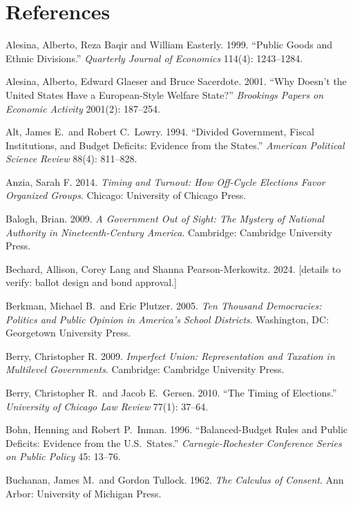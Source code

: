 \section*{References}
\begingroup
\setlength{\parindent}{-0.28in}\setlength{\leftskip}{0.28in}\small

Alesina, Alberto, Reza Baqir and William Easterly. 1999. ``Public Goods and Ethnic Divisions.'' \emph{Quarterly Journal of Economics} 114(4): 1243--1284.

Alesina, Alberto, Edward Glaeser and Bruce Sacerdote. 2001. ``Why Doesn't the United States Have a European-Style Welfare State?'' \emph{Brookings Papers on Economic Activity} 2001(2): 187--254.

Alt, James E.\ and Robert C.\ Lowry. 1994. ``Divided Government, Fiscal Institutions, and Budget Deficits: Evidence from the States.'' \emph{American Political Science Review} 88(4): 811--828.

Anzia, Sarah F. 2014. \emph{Timing and Turnout: How Off-Cycle Elections Favor Organized Groups}. Chicago: University of Chicago Press.

Balogh, Brian. 2009. \emph{A Government Out of Sight: The Mystery of National Authority in Nineteenth-Century America}. Cambridge: Cambridge University Press.

Bechard, Allison, Corey Lang and Shanna Pearson-Merkowitz. 2024. [details to verify: ballot design and bond approval.]

Berkman, Michael B.\ and Eric Plutzer. 2005. \emph{Ten Thousand Democracies: Politics and Public Opinion in America's School Districts}. Washington, DC: Georgetown University Press.

Berry, Christopher R. 2009. \emph{Imperfect Union: Representation and Taxation in Multilevel Governments}. Cambridge: Cambridge University Press.

Berry, Christopher R.\ and Jacob E.\ Gersen. 2010. ``The Timing of Elections.'' \emph{University of Chicago Law Review} 77(1): 37--64.

Bohn, Henning and Robert P.\ Inman. 1996. ``Balanced-Budget Rules and Public Deficits: Evidence from the U.S.\ States.'' \emph{Carnegie-Rochester Conference Series on Public Policy} 45: 13--76.

Buchanan, James M.\ and Gordon Tullock. 1962. \emph{The Calculus of Consent}. Ann Arbor: University of Michigan Press.

